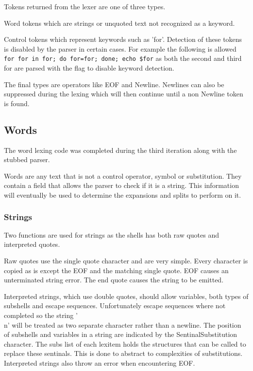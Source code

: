 Tokens returned from the lexer are one of three types.

Word tokens which are strings or unquoted text not recognized as a keyword.

Control tokens which represent keywords such as 'for'.
Detection of these tokens is disabled by the parser in certain cases.
For example the following is allowed \verb!for for in for; do for=for; done; echo $for! as both the second and third for are parsed with the flag to disable keyword detection.

The final types are operators like EOF and Newline. 
Newlines can also be suppressed during the lexing which will then continue until a non Newline token is found. 

\subsection{Words}
The word lexing code was completed during the third iteration along with the stubbed parser.

Words are any text that is not a control operator, symbol or substitution.
They contain a field that allows the parser to check if it is a string.
This information will eventually be used to determine the expansions and splits to perform on it.

\subsubsection{Strings}
Two functions are used for strings as the shells has both raw quotes and interpreted quotes.

Raw quotes use the single quote character and are very simple.
Every character is copied as is except the EOF and the matching single quote.
EOF causes an unterminated string error.
The end quote causes the string to be emitted.

Interpreted strings, which use double quotes, should allow variables, both types of subshells and escape sequences.
Unfortunately escape sequences where not completed so the string '\\n' will be treated as two separate character rather than a newline.
The position of subshells and variables in a string are indicated by the SentinalSubstitution character.
The subs list of each lexitem holds the structures that can be called to replace these sentinals.
This is done to abstract to complexities of substitutions.
Interpreted strings also throw an error when encountering EOF.

